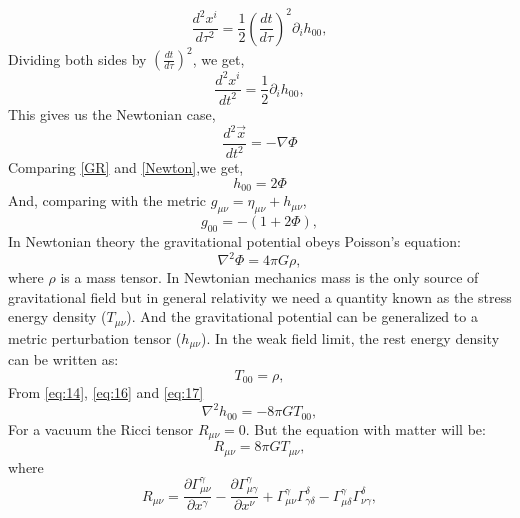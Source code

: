 \documentclass{ttuthes2007}
\begin{document}
\begin{equation}                                                                
\frac{d^2x^i}{d\tau ^2}=\frac{1}{2} \left(\frac{dt}{d\tau}\right)^2 \partial _i h_{00},
\end{equation} 
Dividing both sides by $\left(\frac{dt}{d\tau}\right)^2$, we get,
\begin{equation}\label{GR}
\frac{d^2x^i}{dt^2}=\frac{1}{2} \partial _i h_{00},
\end{equation} 
This gives us the Newtonian case,
\begin{equation} \label{Newton}
\frac{d^2\vec{x}}{dt^2}=-\nabla \Phi
\end{equation}
Comparing \ref{GR} and \ref{Newton},we get,
\begin{equation} \label{eq:14}
h_{00}=2\Phi
\end{equation}
And, comparing with the metric $g_{\mu \nu}= \eta_{\mu \nu} + h_{\mu \nu}$,
\begin{equation}\label{eq:15}
g_{00}=-(1+2\Phi),
\end{equation}
In Newtonian theory the gravitational potential obeys Poisson's
equation:
\begin{equation} \label{eq:16}
\nabla ^ 2\Phi = 4\pi G\rho,
\end{equation}
where $\rho$ is a
mass tensor. In Newtonian mechanics mass is the only source of gravitational
field but in general relativity we need a quantity known as the stress energy
density ($T_{\mu\nu}$). And the gravitational potential can be generalized to a
metric perturbation tensor ($h_{\mu\nu}$).
In the weak field limit, the rest energy density can be written as:
\begin{equation}\label{eq:17}
T_{00}=\rho,
\end{equation}
From \ref{eq:14}, \ref{eq:16} and \ref{eq:17}
\begin{equation} \label{eq:18}
\nabla ^2h_{00}=-8\pi GT_{00},
\end{equation}
For a vacuum the Ricci tensor $R_{\mu \nu} = 0$. But the equation with matter will be:
\begin{equation} \label{eq:19}
R_{\mu \nu} = 8 \pi GT_{\mu \nu},
\end{equation}
where
\begin{equation} \label{eq:22}
R_{\mu \nu} = \frac{\partial \Gamma ^\gamma _{\mu \nu}}{\partial x^\gamma} -
\frac{\partial \Gamma ^\gamma _{\mu \gamma}}{\partial x^\nu}+ \Gamma ^\gamma
_{\mu \nu}\Gamma ^\delta _{\gamma \delta}-\Gamma ^\gamma _{\mu \delta}\Gamma
^\delta_{\nu \gamma},
\end{equation}
\end{document}
